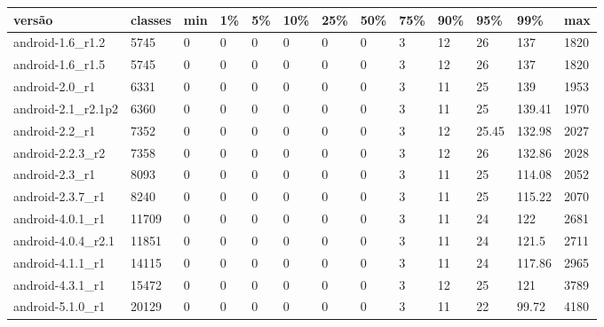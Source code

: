\begin{tabular}{|l|l|l|l|l|l|l|l|l|l|l|l|l|}
\hline
versão&classes&min&1\%&5\%&10\%&25\%&50\%&75\%&90\%&95\%&99\%&max\\
\hline
android-1.6\_r1.2&5745&0&0&0&0&0&0&3&12&26&137&1820\\
\hline
android-1.6\_r1.5&5745&0&0&0&0&0&0&3&12&26&137&1820\\
\hline
android-2.0\_r1&6331&0&0&0&0&0&0&3&11&25&139&1953\\
\hline
android-2.1\_r2.1p2&6360&0&0&0&0&0&0&3&11&25&139.41&1970\\
\hline
android-2.2\_r1&7352&0&0&0&0&0&0&3&12&25.45&132.98&2027\\
\hline
android-2.2.3\_r2&7358&0&0&0&0&0&0&3&12&26&132.86&2028\\
\hline
android-2.3\_r1&8093&0&0&0&0&0&0&3&11&25&114.08&2052\\
\hline
android-2.3.7\_r1&8240&0&0&0&0&0&0&3&11&25&115.22&2070\\
\hline
android-4.0.1\_r1&11709&0&0&0&0&0&0&3&11&24&122&2681\\
\hline
android-4.0.4\_r2.1&11851&0&0&0&0&0&0&3&11&24&121.5&2711\\
\hline
android-4.1.1\_r1&14115&0&0&0&0&0&0&3&11&24&117.86&2965\\
\hline
android-4.3.1\_r1&15472&0&0&0&0&0&0&3&12&25&121&3789\\
\hline
android-5.1.0\_r1&20129&0&0&0&0&0&0&3&11&22&99.72&4180\\
\hline
\end{tabular}
